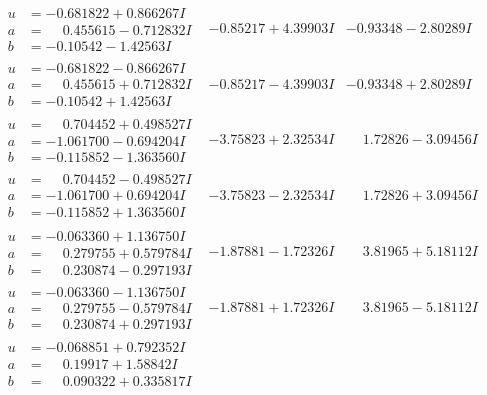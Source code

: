 \documentclass[1p]{elsarticle_modified}
\theoremstyle{definition}
\begin{document}
$$\begin{array}{c|c|c}
\begin{aligned}
u &= -0.681822 + 0.866267 I \\
a &= \phantom{-}0.455615 - 0.712832 I \\
b &= -0.10542 - 1.42563 I\end{aligned}
 & -0.85217 + 4.39903 I & -0.93348 - 2.80289 I \\ \hline\begin{aligned}
u &= -0.681822 - 0.866267 I \\
a &= \phantom{-}0.455615 + 0.712832 I \\
b &= -0.10542 + 1.42563 I\end{aligned}
 & -0.85217 - 4.39903 I & -0.93348 + 2.80289 I \\ \hline\begin{aligned}
u &= \phantom{-}0.704452 + 0.498527 I \\
a &= -1.061700 - 0.694204 I \\
b &= -0.115852 - 1.363560 I\end{aligned}
 & -3.75823 + 2.32534 I & \phantom{-}1.72826 - 3.09456 I \\ \hline\begin{aligned}
u &= \phantom{-}0.704452 - 0.498527 I \\
a &= -1.061700 + 0.694204 I \\
b &= -0.115852 + 1.363560 I\end{aligned}
 & -3.75823 - 2.32534 I & \phantom{-}1.72826 + 3.09456 I \\ \hline\begin{aligned}
u &= -0.063360 + 1.136750 I \\
a &= \phantom{-}0.279755 + 0.579784 I \\
b &= \phantom{-}0.230874 - 0.297193 I\end{aligned}
 & -1.87881 - 1.72326 I & \phantom{-}3.81965 + 5.18112 I \\ \hline\begin{aligned}
u &= -0.063360 - 1.136750 I \\
a &= \phantom{-}0.279755 - 0.579784 I \\
b &= \phantom{-}0.230874 + 0.297193 I\end{aligned}
 & -1.87881 + 1.72326 I & \phantom{-}3.81965 - 5.18112 I \\ \hline\begin{aligned}
u &= -0.068851 + 0.792352 I \\
a &= \phantom{-}0.19917 + 1.58842 I \\
b &= \phantom{-}0.090322 + 0.335817 I\end{aligned}

\end{array}$$
\end{document}
